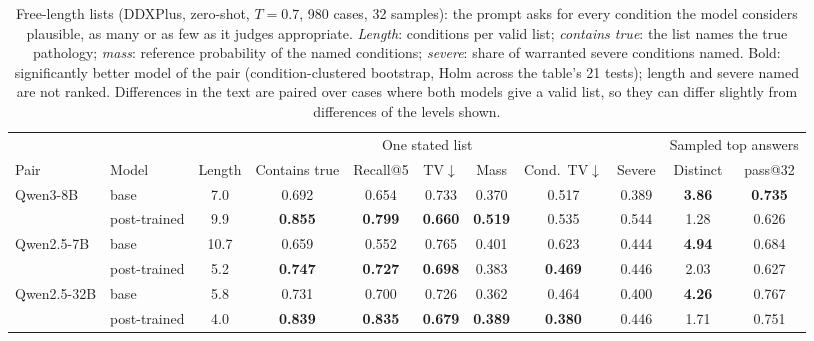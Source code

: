\documentclass[wcp]{jmlr}
\begin{document}
\begin{table}[t]
\centering\small
\setlength{\tabcolsep}{3.5pt}
\begin{adjustbox}{max width=\linewidth}
\begin{tabular}{llccccccccc}
\toprule
 & & \multicolumn{7}{c}{One stated list} & \multicolumn{2}{c}{Sampled top answers} \\
Pair & Model & Length & Contains true & Recall@5 & TV$\downarrow$ & Mass & Cond.\ TV$\downarrow$ & Severe & Distinct & pass@32 \\
\midrule
Qwen3-8B & base & 7.0 & 0.692 & 0.654 & 0.733 & 0.370 & 0.517 & 0.389 & \textbf{3.86} & \textbf{0.735} \\
 & post-trained & 9.9 & \textbf{0.855} & \textbf{0.799} & \textbf{0.660} & \textbf{0.519} & 0.535 & 0.544 & 1.28 & 0.626 \\
\midrule
Qwen2.5-7B & base & 10.7 & 0.659 & 0.552 & 0.765 & 0.401 & 0.623 & 0.444 & \textbf{4.94} & 0.684 \\
 & post-trained & 5.2 & \textbf{0.747} & \textbf{0.727} & \textbf{0.698} & 0.383 & \textbf{0.469} & 0.446 & 2.03 & 0.627 \\
\midrule
Qwen2.5-32B & base & 5.8 & 0.731 & 0.700 & 0.726 & 0.362 & 0.464 & 0.400 & \textbf{4.26} & 0.767 \\
 & post-trained & 4.0 & \textbf{0.839} & \textbf{0.835} & \textbf{0.679} & \textbf{0.389} & \textbf{0.380} & 0.446 & 1.71 & 0.751 \\
\bottomrule
\end{tabular}
\end{adjustbox}
\caption{Free-length lists (DDXPlus, zero-shot, $T{=}0.7$, 980 cases, 32 samples): the prompt asks for every condition the model considers plausible, as many or as few as it judges appropriate. \emph{Length}: conditions per valid list; \emph{contains true}: the list names the true pathology; \emph{mass}: reference probability of the named conditions; \emph{severe}: share of warranted severe conditions named. Bold: significantly better model of the pair (condition-clustered bootstrap, Holm across the table's 21 tests); length and severe named are not ranked. Differences in the text are paired over cases where both models give a valid list, so they can differ slightly from differences of the levels shown.}
\label{tab:freelen}
\end{table}
\end{document}
